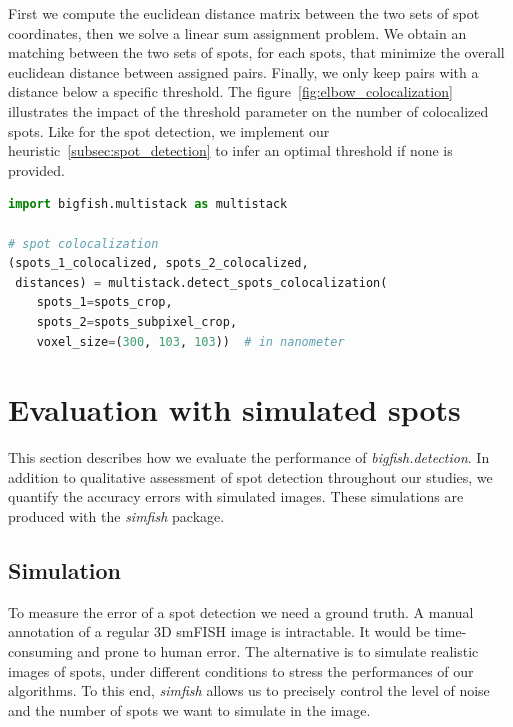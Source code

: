 First we compute the euclidean distance matrix between the two sets of spot coordinates, then we solve a linear sum assignment problem\cite{crouse_linear_assignment_2016, 2020SciPy-NMeth}.
We obtain an matching between the two sets of spots, for each spots, that minimize the overall euclidean distance between assigned pairs.
Finally, we only keep pairs with a distance below a specific threshold.
The figure~\ref{fig:elbow_colocalization} illustrates the impact of the threshold parameter on the number of colocalized spots.
Like for the spot detection, we implement our heuristic~\ref{subsec:spot_detection} to infer an optimal threshold if none is provided.\\

\begin{minipage}{0.9\textwidth}
\begin{lstlisting}[language=Python]
import bigfish.multistack as multistack

# spot colocalization
(spots_1_colocalized, spots_2_colocalized,
 distances) = multistack.detect_spots_colocalization(
	spots_1=spots_crop,
	spots_2=spots_subpixel_crop,
	voxel_size=(300, 103, 103))  # in nanometer
\end{lstlisting}
\end{minipage}

\section{Evaluation with simulated spots} \label{sec:detection_evaluation}

This section describes how we evaluate the performance of \emph{bigfish.detection}.
In addition to qualitative assessment of spot detection throughout our studies, we quantify the accuracy errors with simulated images.
These simulations are produced with the \emph{simfish} package.

\subsection{Simulation} \label{subsec:simulation}

To measure the error of a spot detection we need a ground truth.
A manual annotation of a regular 3D \ac{smFISH} image is intractable.
It would be time-consuming and prone to human error.
The alternative is to simulate realistic images of spots, under different conditions to stress the performances of our algorithms.
To this end, \emph{simfish} allows us to precisely control the level of noise and the number of spots we want to simulate in the image.

